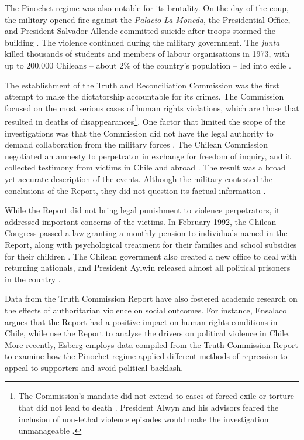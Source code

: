 \documentclass[12pt,a4paper,]{article}
\begin{document}
The Pinochet regime was also notable for its brutality. On the day of
the coup, the military opened fire against the \emph{Palacio La Moneda},
the Presidential Office, and President Salvador Allende committed
suicide after troops stormed the building \citep{verdugo2001chile}. The
violence continued during the military government. The \emph{junta}
killed thousands of students and members of labour organisations in
1973, with up to 200,000 Chileans -- about 2\% of the country's
population -- led into exile \citep[31]{wright2007chilean}.

The establishment of the Truth and Reconciliation Commission was the
first attempt to make the dictatorship accountable for its crimes. The
Commission focused on the most serious cases of human rights violations,
which are those that resulted in deaths of disappearances\footnote{The
  Commission's mandate did not extend to cases of forced exile or
  torture that did not lead to death \citep[660]{ensalaco1994truth}.
  President Alwyn and his advisors feared the inclusion of non-lethal
  violence episodes would make the investigation unmanageable
  \citep[163]{vasallo2002truth}.}. One factor that limited the scope of
the investigations was that the Commission did not have the legal
authority to demand collaboration from the military forces
\citep[85]{popkin1995truth}. The Chilean Commission negotiated an
amnesty to perpetrator in exchange for freedom of inquiry, and it
collected testimony from victims in Chile and abroad
\citep[399]{quinn2001dealing}. The result was a broad yet accurate
description of the events. Although the military contested the
conclusions of the Report, they did not question its factual information
\citetext{\citealp[54]{bakiner2009denial}; \citealp{brahm2005beyond}}.

While the Report did not bring legal punishment to violence
perpetrators, it addressed important concerns of the victims. In
February 1992, the Chilean Congress passed a law granting a monthly
pension to individuals named in the Report, along with psychological
treatment for their families and school subsidies for their children
\citep[167]{vasallo2002truth}. The Chilean government also created a new
office to deal with returning nationals, and President Aylwin released
almost all political prisoners in the country
\citep[400]{quinn2001dealing}.

Data from the Truth Commission Report have also fostered academic
research on the effects of authoritarian violence on social outcomes.
For instance, Ensalaco
\citetext{\citeyear{ensalaco1994truth}; \citeyear{ensalaco2000chile}}
argues that the Report had a positive impact on human rights conditions
in Chile, while \citet{davis1990they} use the Report to analyse the
drivers on political violence in Chile. More recently, Esberg
\citetext{\citeyear{esberg2018antecipating}; \citeyear{esberg2018audience}}
employs data compiled from the Truth Commission Report to examine how
the Pinochet regime applied different methods of repression to appeal to
supporters and avoid political backlash.
\end{document}
